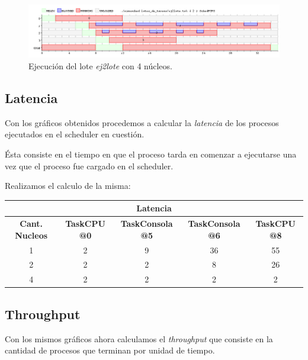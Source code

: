 \begin{figure}[!h]
	\begin{center}
		\includegraphics[width=500px]{imagenes/ej2_4.png}
		\caption{Ejecución del lote \emph{ej2lote} con 4 núcleos.}
		\label{fig:grafico_ej2_4}
	\end{center}
\end{figure}

\newpage

\subsection{Latencia}

Con los gráficos obtenidos procedemos a calcular la \emph{latencia} de los procesos ejecutados en el scheduler en cuestión.

Ésta consiste en el tiempo en que el proceso tarda en comenzar a ejecutarse una vez que el proceso fue cargado en el scheduler.

Realizamos el calculo de la misma:

\begin{center}
	\begin{tabular}{|c|c|c|c|c|}
		\hline
		\multicolumn{5}{|c|}{\large{\textbf{Latencia}}} \\
		\hline
		\textbf{Cant. Nucleos} & \textbf{TaskCPU @0} & \textbf{TaskConsola @5} & \textbf{TaskConsola @6} & \textbf{TaskCPU @8} \\
		\hline
		1 & 2 & 9 & 36 & 55 \\
		2 & 2 & 2 & 8 & 26 \\
		4 & 2 & 2 & 2 & 2 \\
		\hline
	\end{tabular}
\end{center}


\subsection{Throughput}

Con los mismos gráficos ahora calculamos el \emph{throughput} que consiste en la cantidad de procesos que terminan por unidad de tiempo.

